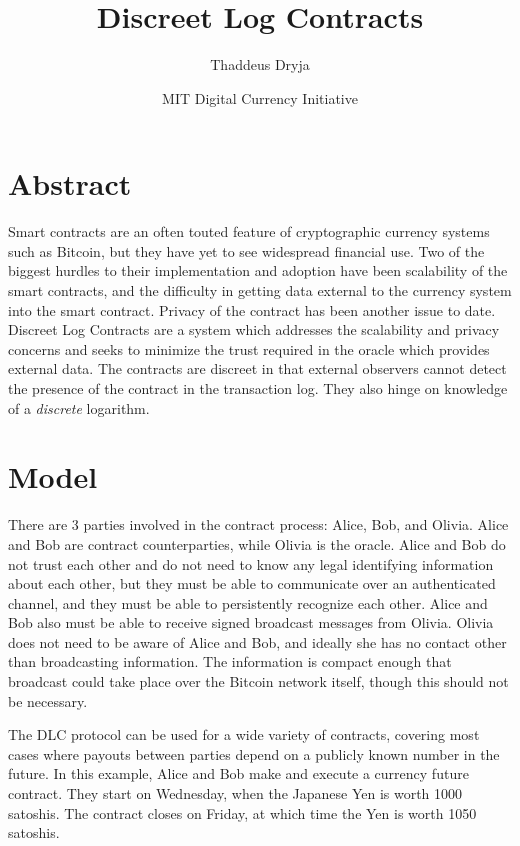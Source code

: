 \documentclass[11pt]{article}
\title{\textbf{Discreet Log Contracts}}
\author{Thaddeus Dryja}
\date{MIT Digital Currency Initiative}
\begin{document}
\maketitle

\section*{Abstract}

Smart contracts \cite{szabo1997formalizing} are an often touted feature of cryptographic currency systems such as Bitcoin, but they have yet to see widespread financial use.  Two of the biggest hurdles to their implementation and adoption have been scalability of the smart contracts, and the difficulty in getting data external to the currency system into the smart contract.  Privacy of the contract has been another issue to date.  Discreet Log Contracts are a system which addresses the scalability and privacy concerns and seeks to minimize the trust required in the oracle which provides external data.  The contracts are discreet in that external observers cannot detect the presence of the contract in the transaction log.  They also hinge on knowledge of a \textit{discrete} logarithm.


\section*{Model}

There are 3 parties involved in the contract process: Alice, Bob, and Olivia.  Alice and Bob are contract counterparties, while Olivia is the oracle.  Alice and Bob do not trust each other and do not need to know any legal identifying information about each other, but they must be able to communicate over an authenticated channel, and they must be able to persistently recognize each other.  Alice and Bob also must be able to receive signed broadcast messages from Olivia.  Olivia does not need to be aware of Alice and Bob, and ideally she has no contact other than broadcasting information.  The information is compact enough that broadcast could take place over the Bitcoin network itself, though this should not be necessary.

The DLC protocol can be used for a wide variety of contracts, covering most cases where payouts between parties depend on a publicly known number in the future.  In this example, Alice and Bob make and execute a currency future contract.  They start on Wednesday, when the Japanese Yen is worth 1000 satoshis.  The contract closes on Friday, at which time the Yen is worth 1050 satoshis.
\end{document}
